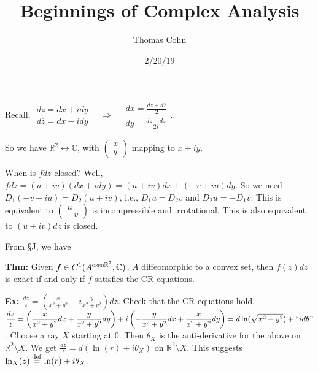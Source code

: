 \documentclass[10pt,letterpaper]{article}
\author{Thomas Cohn}
\title{Beginnings of Complex Analysis}
\date{2/20/19} %
\newcommand{\n}{\hfill\break}
\newcommand{\thm}[1]{\par\noindent\settowidth{\hangindent}{\textbf{Thm: }}\textbf{Thm: }#1\n}
\newcommand{\ex}[1]{\par\noindent\settowidth{\hangindent}{\textbf{Ex: }}\textbf{Ex: }#1\n}
\newcommand{\ptxt}[1]{\textrm{\textnormal{#1}}}
\newcommand{\reals}{\mathbb{R}}
\newcommand{\R}{\reals}
\newcommand{\complex}{\mathbb{C}}
\newcommand{\C}{\complex}
\newcommand{\cut}{\setminus}
\newcommand{\conj}[1]{\overline{#1}}
\newcommand{\eqdef}{\overset{\ptxt{def}}{=}}
\newcommand{\paren}[1]{\left(#1\right)}
\begin{document}
\maketitle
\setlength\RaggedRightParindent{\parindent}
\RaggedRight

\par\noindent Recall, $\begin{array}{r}dz=dx+idy\\ d\conj{z}=dx-idy\end{array}\quad\Rightarrow\quad\begin{array}{l}dx=\frac{dz+d\conj{z}}{2}\\ dy=\frac{dz-d\conj{z}}{2i}\end{array}$.\n


\par\noindent So we have $\R^{2}\leftrightarrow\C$, with $\paren{\begin{array}{c}x\\ y\end{array}}$ mapping to $x+iy$.\n

\par\noindent When is $fdz$ closed? Well, $fdz=(u+iv)(dx+idy)=(u+iv)dx+(-v+iu)dy$.\n
So we need $D_{1}(-v+iu)=D_{2}(u+iv)$, i.e., $D_{1}u=D_{2}v$ and $D_{2}u=-D_{1}v$.\n
This is equivalent to $\paren{\begin{array}{c}u\\ -v\end{array}}$ is incompressible and irrotational.\n
This is also equivalent to $(u+iv)d\conj{z}$ is closed.\n

\par\noindent From \S{}J, we have
\thm{Given $f\in{}C^{1}(A^{\ptxt{osso}\R^{2}},\C)$, $A$ diffeomorphic to a convex set, then $f(z)dz$ is exact if and only if $f$ satisfies the CR equations.}

\ex{$\displaystyle\frac{dz}{z}=\paren{\frac{x}{x^{2}+y^{2}}-i\frac{y}{x^{2}+y^{2}}}dz$. Check that the CR equations hold.\n
$\displaystyle\frac{dz}{z}=\paren{\frac{x}{x^{2}+y^{2}}dx+\frac{y}{x^{2}+y^{2}}dy}+i\paren{-\frac{y}{x^{2}+y^{2}}dx+\frac{x}{x^{2}+y^{2}}dy}=d\ln(\sqrt{x^{2}+y^{2}})+``id\theta"$.\n
Choose a ray $X$ starting at $0$. Then $\theta_{X}$ is the anti-derivative for the above on $\R^{2}\cut{}X$.\n
We get $\frac{dz}{z}=d(\ln(r)+i\theta_{X})$ on $\R^{2}\cut{}X$.\n
This suggests $\ln_{X}(z)\eqdef\ln(r)+i\theta_{X}$.}
\end{document}
